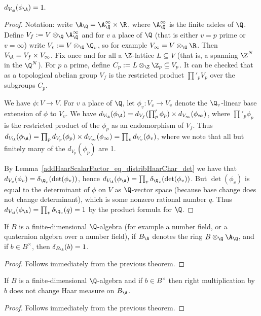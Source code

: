   \begin{theorem}
    \label{addHaarScalarFactor_eq_one}
    $d_{V_{\A}}(\phi_{\A})=1.$
  \end{theorem}
  \begin{proof}
    Notation: write $\A_{\Q}=\A_{\Q}^\infty\times\R$, where $\A_{\Q}^\infty$ is the finite adeles of $\Q$.
    Define $V_f:= V\otimes_{\Q}\A_{\Q}^\infty$ and for $v$ a place of $\Q$ (that is either $v=p$ prime
    or $v=\infty$) write $V_v:=V\otimes_{\Q}\Q_v$, so for example $V_\infty=V\otimes_{\Q}\R$.
    Then $V_{\A}=V_f\times V_\infty$. Fix once and for all a $\Z$-lattice $L\subseteq V$
    (that is, a spanning $\Z^N$ in the $\Q^N$).
    For $p$ a prime, define $C_p:=L\otimes_{\Z}\Z_p\subseteq V_p$. It can be checked that
    as a topological abelian group $V_f$ is the restricted product $\prod'_p V_p$ over the
    subgroups $C_p$.

    We have $\phi:V\to V$. For $v$ a place of $\Q$, let $\phi_v:V_v\to V_v$ denote the $\Q_v$-linear
    base extension of $\phi$ to $V_v$. We have $d_{V_{\A}}(\phi_{\A})=d_{V_f}(\prod'_p \phi_p)\times d_{V_\infty}(\phi_\infty)$,
    where $\prod'_p \phi_p$ is the restricted product of the $\phi_p$ as an endomorphism of $V_f$.
    Thus $d_{V_{\A}}(\phi_{\A})=\prod_p d_{V_p}(\phi_p)\times d_{V_\infty}(\phi_\infty)=\prod_v d_{V_v}(\phi_v)$, where
    we note that all but finitely many of the $d_{V_p}(\phi_p)$ are 1.

    By Lemma~\ref{addHaarScalarFactor_eq_distribHaarChar_det} we have that
    $d_{V_v}(\phi_v)=\delta_{\Q_v}(\det(\phi_v))$, hence $d_{V_{\A}}(\phi_{\A})=\prod_v\delta_{\Q_v}(\det(\phi_v))$.
    But $\det(\phi_v)$ is equal to the determinant of $\phi$ on $V$ as $\Q$-vector space (because
    base change does not change determinant),
    which is some nonzero rational number $q$. Thus $d_{V_{\A}}(\phi_{\A})=\prod_v\delta_{\Q_v}(q)=1$
    by the product formula for $\Q$.
  \end{proof}

  \begin{corollary} If $B$ is a finite-dimensional $\Q$-algebra (for example a number field, or a quaternion algebra over a number field),
    if $B_{\A}$ denotes the ring $B\otimes_{\Q}\A_{\Q}$, and if $b\in B^\times$,
    then $\delta_{B_{\A}}(b)=1$.
  \end{corollary}
  \begin{proof}
    Follows immediately from the previous theorem.
  \end{proof}

  \begin{corollary} If $B$ is a finite-dimensional $\Q$-algebra and
    if $b\in B^\times$ then right multiplication by $b$
    does not change Haar measure on $B_{\A}$.
  \end{corollary}
  \begin{proof}
    Follows immediately from the previous theorem.
  \end{proof}
